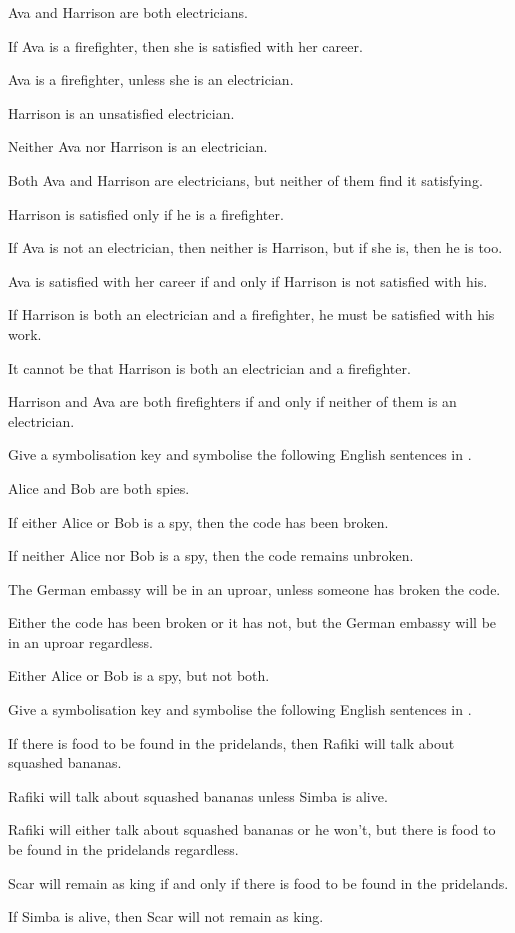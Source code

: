 \begin{earg}
\item Ava and Harrison are both electricians.
\item If Ava is a firefighter, then she is satisfied with her career.
\item Ava is a firefighter, unless she is an electrician.
\item Harrison is an unsatisfied electrician.
\item Neither Ava nor Harrison is an electrician.
\item Both Ava and Harrison are electricians, but neither of them find it satisfying.
\item Harrison is satisfied only if he is a firefighter.
\item If Ava is not an electrician, then neither is Harrison, but if she is, then he is too.
\item Ava is satisfied with her career if and only if Harrison is not satisfied with his.
\item If Harrison is both an electrician and a firefighter, he must be satisfied with his work.
\item It cannot be that Harrison is both an electrician and a firefighter.
\item Harrison and Ava are both firefighters if and only if neither of them is an electrician.
\end{earg}

\problempart
\label{pr.spies}
Give a symbolisation key and symbolise the following English sentences in \TFL.
\begin{earg}
\item Alice and Bob are both spies.
\item If either Alice or Bob is a spy, then the code has been broken.
\item If neither Alice nor Bob is a spy, then the code remains unbroken.
\item The German embassy will be in an uproar, unless someone has broken the code.
\item Either the code has been broken or it has not, but the German embassy will be in an uproar regardless.
\item Either Alice or Bob is a spy, but not both.
\end{earg}

\problempart Give a symbolisation key and symbolise the following English sentences in \TFL.
\begin{earg}
\item If there is food to be found in the pridelands, then Rafiki will talk about squashed bananas.
\item Rafiki will talk about squashed bananas unless Simba is alive.
\item Rafiki will either talk about squashed bananas or he won't, but there is food to be found in the pridelands regardless.
\item Scar will remain as king if and only if there is food to be found in the pridelands.
\item If Simba is alive, then Scar will not remain as king.
\end{earg}

